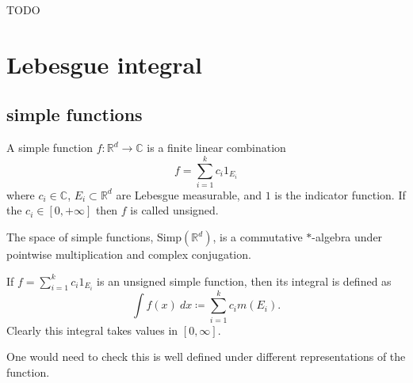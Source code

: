 \documentclass[12pt]{article}
\begin{document}
\begin{example}
	TODO
\end{example}


\section{Lebesgue integral} %

\subsection{simple functions} %

\begin{definition}
	A simple function $f:\mathbb{R}^d\to\mathbb{C}$ is a finite linear combination
	\begin{equation*}
		f=\sum_{i=1}^k c_i 1_{E_i}
	\end{equation*}
	where $c_i\in\mathbb{C}$, $E_i\subset\mathbb{R}^d$ are Lebesgue measurable, and $1$ is the indicator function. If the $c_i\in[0,+\infty]$ then $f$ is called unsigned.
\end{definition}

\begin{remark}[]
	The space of simple functions, $\text{Simp}(\mathbb{R}^d)$, is a commutative $\ast$-algebra under pointwise multiplication and complex conjugation.
\end{remark}

\begin{definition}
	If $f=\sum_{i=1}^k c_i1_{E_i}$ is an unsigned simple function, then its integral is defined as
	\begin{equation*}
		\int f(x)\ dx\coloneqq \sum_{i=1}^k c_im(E_i).
	\end{equation*}
	Clearly this integral takes values in $[0,\infty]$.
\end{definition}

\begin{remark}[]
	One would need to check this is well defined under different representations of the function.
\end{remark}
\end{document}
